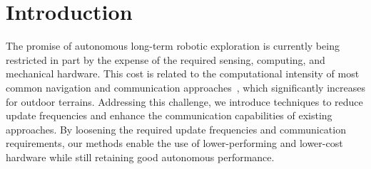 \documentclass[letterpaper,10pt,conference,twoside]{IEEEtran}
\theoremstyle{definition}
\begin{document}

\section{Introduction}
\noindent
The promise of autonomous long-term robotic exploration is currently being restricted %
in part by the expense of the required sensing, computing, and mechanical hardware. %
This cost is related to the computational intensity of most common navigation and communication approaches~\cite{lluvia2021active,placed2022survey}, which significantly increases for %
outdoor terrains. Addressing this challenge, we introduce %
techniques to reduce update frequencies and enhance the communication capabilities of existing approaches. By loosening the required update frequencies and communication requirements, our methods enable the use of lower-performing and lower-cost hardware while still retaining good autonomous performance.
\end{document}
